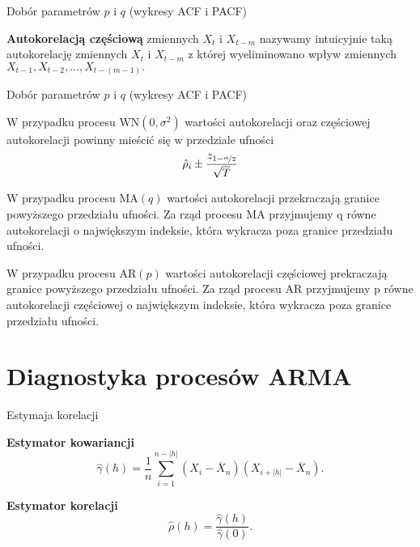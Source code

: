 \documentclass[a4paper, 11pt]{beamer}
\begin{document}
	\begin{frame}{Dobór parametrów $p$ i $q$ (wykresy ACF i PACF)}
		\begin{flushleft}
			\textbf{Autokorelacją częściową} zmiennych $X_{t}$ i $X_{t-m}$ nazywamy intuicyjnie taką autokorelację zmiennych
				$X_{t}$ i $X_{t-m}$ z której wyeliminowano wpływ zmiennych $X_{t-1}, X_{t-2}, \ldots, X_{t-(m-1)}.$
		\end{flushleft}
	\end{frame}
	
	\begin{frame}{Dobór parametrów $p$ i $q$ (wykresy ACF i PACF)}
		\begin{flushleft}
			W przypadku procesu $\mbox{WN}\left(0, \sigma^2\right)$ wartości autokorelacji oraz częściowej autokorelacji powinny mieścić się w przedziale
			ufności \[
				\hat{\rho}_{i} \pm \frac{z_{1 - \nicefrac{\alpha}{2}}}{\sqrt{T}}
			\]
		\end{flushleft}
		\begin{flushleft}
			W przypadku procesu $\mbox{MA}\left(q\right)$ wartości autokorelacji przekraczają granice powyższego przedziału ufności.
			Za rząd procesu MA przyjmujemy q równe autokorelacji o największym indeksie, która wykracza poza granice przedziału ufności.
		\end{flushleft}
		\begin{flushleft}
			W przypadku procesu $\mbox{AR}\left(p\right)$ wartości autokorelacji częściowej prekraczają granice powyższego przedziału ufności.
			Za rząd procesu AR przyjmujemy p równe autokorelacji częściowej o największym indeksie, która wykracza poza granice przedziału ufności.
		\end{flushleft}
	\end{frame}
	
	\section{Diagnostyka procesów ARMA}
	
	\begin{frame}{Estymaja korelacji}
		\begin{block}{\textbf{Estymator kowariancji}} \[
				\hat{\gamma}\left(h\right) = \frac{1}{n}
					\sum_{i=1}^{n - \left|h\right|}
					\left(X_{i} - \overline{X}_{n}\right)
					\left(X_{i+\left|h\right|} - \overline{X}_{n}\right).
			\]
		\end{block}
		\begin{block}{\textbf{Estymator korelacji}} \[
				\hat{\rho}\left(h\right) = \frac{
					\hat{\gamma}\left(h\right)
				}{
					\hat{\gamma}\left(0\right)
				}.
			\]
		\end{block}
	\end{frame}
	
\end{document}
